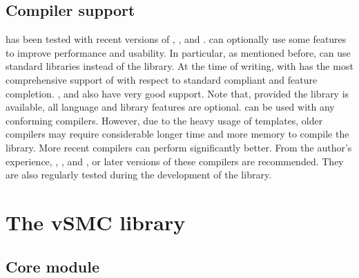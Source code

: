 \documentclass[11pt, fontset=Minion, showoverfull,
bib, biblatexstyle=numeric, mintcode, minted=cache]{marticle}
\begin{document}
\subsection{Compiler support}

\vsmc has been tested with recent versions of \clang, \cgcc, \cicpc and
\cmsvc. \vsmc can optionally use some \cppoo features to improve performance
and usability. In particular, as mentioned before, \vsmc can use \cppoo
standard libraries instead of the \boost library. At the time of writing,
\clang with \libcpp has the most comprehensive support of \cppoo with respect
to standard compliant and feature completion.  ,  and  also have very good \cppoo support. Note that, provided the \boost
library is available, all \cppoo language and library features are optional.
\vsmc can be used with any \cppne conforming compilers. However, due to the
heavy usage of templates, older compilers may require considerable longer time
and more memory to compile the library. More recent compilers can perform
significantly better. From the author's experience, , ,
 and , or later versions of these compilers are
recommended. They are also regularly tested during the development of the
library.

\section{The vSMC library}
\label{sec:The vSMC library}

\subsection{Core module}
\label{sub:Core module}
\end{document}
